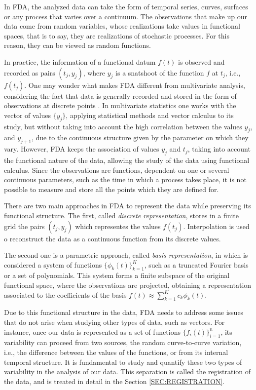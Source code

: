 In FDA, the analyzed data can take the form of temporal series, curves,
surfaces or any process that varies over a continuum. The observations that
make up our data come from random variables, whose realizations take
values in functional spaces, that is to say, they are realizations of
stochastic processes. For this reason, they can be viewed as random functions.

In practice, the information of a functional datum $f(t)$ is observed and
recorded as pairs $(t_j, y_j)$, where $y_j$ is a snatshoot of the
function $f$ at $t_j$, i.e., $f(t_j)$.
One may wonder what makes FDA different from multivariate analysis, considering
the fact that data is generally recorded and stored in the form of
observations at discrete points \cite{Srivastava2016}.
In multivariate statistics one works with the vector of values $\{y_j\}$,
applying statistical methods and vector calculus to its study,
but without taking into account the high correlation between the values
$y_j$, and $y_{j+1}$, due to the continuous structure given by the parameter on
which they vary. 
However, FDA keeps the association of
values ${y_j}$ and ${t_j}$, taking into account the functional nature of the
data, allowing the study of the data using functional calculus.
Since the observations are functions, dependent on one or several continuous
parameters, such as the time in which a process takes place, it is not
possible to measure and store all the points which they are defined for.

There are two main approaches in FDA to represent the data while preserving its
functional structure. The first, called \textit{discrete representation}, stores
in a finite grid the pairs $(t_j, y_j)$ which representes the values $f(t_j)$. Interpolation is used o reconstruct the data as a continuous function from its discrete values.

The second one is a parametric approach, called \textit{basis representation},
in which is considered a system of functions $\{\phi_k(t) \}_{k=1}^K$, such as a
truncated Fourier basis or a set of polynomials. This system forms a finite
subspace of the original functional space, where the
observations are projected, obtaining a representation associated to the
coefficients of the basis $f(t) \approx \sum_{k=1}^K c_k\phi_k(t)$.

Due to this functional structure in the data,
FDA needs to address some issues that do not arise when studying other types of
data, such as vectors.
For instance, once our data is represented as a set of functions
$\{f_i(t)\}_{i=1}^{n}$, its variability can proceed from two sources,
the random curve-to-curve variation, i.e., the difference between the values of
the functions, or from its internal temporal structure.
It is fundamental to study and quantify these two types of variability in
the analysis of our data. This separation is called the registration of the data,
and is treated in detail in the Section \ref{SEC:REGISTRATION}.

